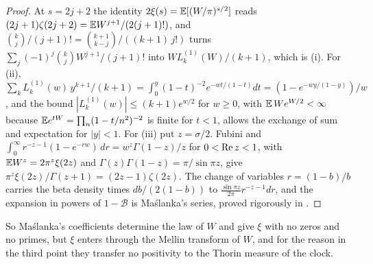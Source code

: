 \begin{proof}
At $s=2j+2$ the identity $2\xi(s)=\mathbb{E}[(W/\pi)^{s/2}]$ reads $(2j+1)\zeta(2j+2)=\mathbb{E} W^{j+1}/(2(j+1)!)$, and $\binom kj/(j+1)!=\binom{k+1}{k-j}/((k+1)\,j!)$ turns $\sum_j(-1)^j\binom kjW^{j+1}/(j+1)!$ into $W L^{(1)}_k(W)/(k+1)$, which is (i). For (ii), $\sum_kL^{(1)}_k(w)\,y^{k+1}/(k+1)=\int_0^y(1-t)^{-2}e^{-wt/(1-t)}dt=(1-e^{-wy/(1-y)})/w$, and the bound $|L^{(1)}_k(w)|\le(k+1)e^{w/2}$ for $w\ge0$, with $\mathbb{E}\,We^{W/2}<\infty$ because $\mathbb{E} e^{tW}=\prod_n(1-t/n^2)^{-2}$ is finite for $t<1$, allows the exchange of sum and expectation for $|y|<1$. For (iii) put $z=\sigma/2$. Fubini and $\int_0^\infty r^{-z-1}(1-e^{-rw})\,dr=w^z\Gamma(1-z)/z$ for $0<\operatorname{Re} z<1$, with $\mathbb{E} W^z=2\pi^z\xi(2z)$ and $\Gamma(z)\Gamma(1-z)=\pi/\sin\pi z$, give $\pi^z\xi(2z)/\Gamma(z+1)=(2z-1)\zeta(2z)$. The change of variables $r=(1-b)/b$ carries the beta density times $db/(2(1-b))$ to $\frac{\sin\pi z}{2\pi}r^{-z-1}dr$, and the expansion in powers of $1-\mathcal B$ is Ma\'slanka's series, proved rigorously in \cite{BaezDuarte10}.
\end{proof}

So Ma\'slanka's coefficients determine the law of $W$ and give $\xi$ with no zeros and no primes, but $\xi$ enters through the Mellin transform of $W$, and for the reason in the third point they transfer no positivity to the Thorin measure of the clock.

